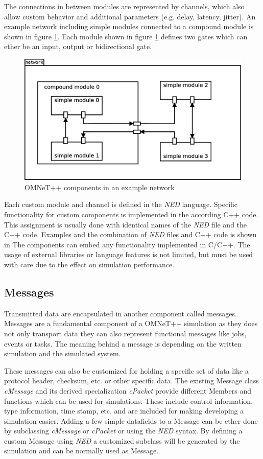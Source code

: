 \documentclass[journal]{IEEEtran}
\begin{document}
The connections in between modules are represented by channels, which also allow custom behavior and additional parameters (e.g. delay, latency, jitter).
An example network including simple modules connected to a compound module is shown in figure \ref{fig:OMNeTComponents}.
Each module shown in figure \ref{fig:OMNeTComponents} defines two gates which can ether be an input, output or bidirectional gate.

\begin{figure}
    \centering
    \includegraphics[width=0.9\columnwidth]{OMNeTComponents.eps}
    \caption{OMNeT++ components in an example network}
    \label{fig:OMNeTComponents}
\end{figure}

Each custom module and channel is defined in the \emph{NED} language.
Specific functionality for custom components is implemented in the according C++ code.
This assignment is usually done with identical names of the \emph{NED} file and the C++ code.
Examples and the combination of \emph{NED} files and C++ code is shown in \cite[chapter 3, chapter 4]{OMNETMANUAL}
The components can embed any functionality implemented in C/C++.
The usage of external libraries or language features is not limited, but must be used with care due to the effect on simulation performance.


\subsection{Messages}
Transmitted data are encapsulated in another component called messages.
Messages are a fundamental component of a OMNeT++ simulation as they does not only transport data they can also represent functional messages like jobs, events or tasks.
The meaning behind a message is depending on the written simulation and the simulated system.

These messages can also be customized for holding a specific set of data like a protocol header, checksum, etc. or other specific data.
The existing Message class \emph{cMessage} and its derived specialization \emph{cPacket} provide different Members and functions which can be used for simulations.
These include control information, type information, time stamp, etc. and are included for making developing a simulation easier.
Adding a few simple datafields to a Message can be ether done by subclassing \emph{cMessage} or \emph{cPacket} or using the \emph{NED} syntax.
By defining a custom Message using \emph{NED} a customized subclass will be generated by the simulation and can be normally used as Message.
\end{document}
